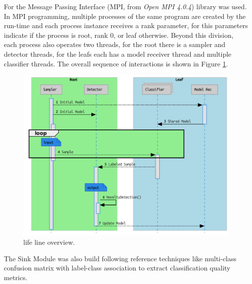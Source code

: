 For \mfog the Message Passing Interface (MPI, from \emph{Open MPI 4.0.4}) library was used.
In MPI programming, multiple processes of the same program are created by the
run-time and each process instance receives a rank parameter, for \mfog this
parameters indicate if the process is root, rank $0$, or leaf otherwise.
Beyond this division, each process also operates two threads, for the root
there is a sampler and detector threads, for the leafs each has a model receiver
thread and multiple classifier threads.
The overall sequence of interactions is shown in Figure \ref{fig:mfog-mpi-life}.

\begin{figure}[htb]
  \centerline{
    \includegraphics[width=0.9\linewidth,page=1]{figures/lifecycle.uml.svg.pdf}
  }
  \caption{\mfog life line overview.}
  \label{fig:mfog-mpi-life}
\end{figure}

The Sink Module was also build following reference techniques like
multi-class confusion matrix with label-class association
\cite{Faria2016minas}
to extract classification quality metrics.
